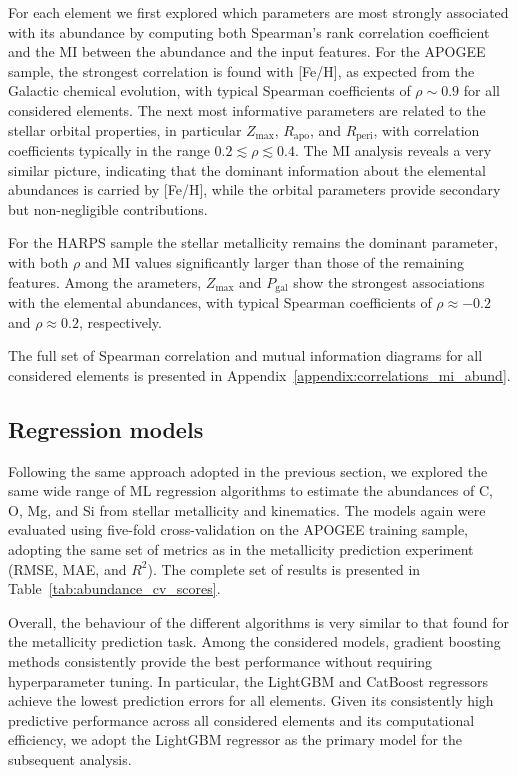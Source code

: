 \documentclass{aa}
\begin{document}
For each element we first explored which parameters are most strongly associated with its abundance by computing both Spearman's rank correlation coefficient and the MI between the abundance and the input features. For the APOGEE sample, the strongest correlation is found with [Fe/H], as expected from the Galactic chemical evolution, with typical Spearman coefficients of $\rho \sim 0.9$ for all considered elements. The next most informative parameters are related to the stellar orbital properties, in particular $Z_{\max}$, $R_{\mathrm{apo}}$, and $R_{\mathrm{peri}}$, with correlation coefficients typically in the range $0.2 \lesssim \rho \lesssim 0.4$. The MI analysis reveals a very similar picture, indicating that the dominant information about the elemental abundances is carried by [Fe/H], while the orbital parameters provide secondary but non-negligible contributions.

For the HARPS sample the stellar metallicity remains the dominant parameter, with both $\rho$ and MI values significantly larger than those of the remaining features. Among the arameters, $Z_{\max}$ and $P_{\mathrm{gal}}$ show the strongest associations with the elemental abundances, with typical Spearman coefficients of $\rho \approx -0.2$ and $\rho \approx 0.2$, respectively.

The full set of Spearman correlation and mutual information diagrams for all considered elements is presented in Appendix~\ref{appendix:correlations_mi_abund}.


\subsection{Regression models}

Following the same approach adopted in the previous section, we explored the same wide range of ML regression algorithms to estimate the abundances of C, O, Mg, and Si from stellar metallicity and kinematics.  The models again were evaluated using five-fold cross-validation on the APOGEE training sample, adopting the same set of metrics as in the metallicity prediction experiment (RMSE, MAE, and $R^2$). The complete set of results is presented in Table~\ref{tab:abundance_cv_scores}.

Overall, the behaviour of the different algorithms is very similar to that found for the metallicity prediction task. Among the considered models, gradient boosting methods consistently provide the best performance without requiring hyperparameter tuning. In particular, the LightGBM and CatBoost regressors achieve the lowest prediction errors for all elements. Given its consistently high predictive performance across all considered elements and its computational efficiency, we adopt the LightGBM regressor as the primary model for the subsequent analysis.
\end{document}
